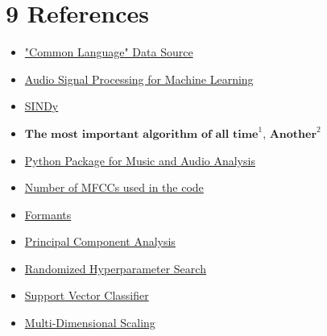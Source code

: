 \documentclass{article}
\begin{document}
\section*{9 \space References}
\begin{itemize}
    \item \href{https://huggingface.co/datasets/common_language}{"Common Language" Data Source}

    \item \href{https://www.youtube.com/playlist?list=PL-wATfeyAMNqIee7cH3q1bh4QJFAaeNv0}{Audio Signal Processing for Machine Learning}

    \item \href{https://www.youtube.com/playlist?list=PLkjmwL-pF6dzj5aSN2sa4ZNm92G9b4ca2}{SINDy}

    \item \href{https://youtu.be/nmgFG7PUHfo?si=emVgNvaE7BQpk3al}{$\textbf{The most important algorithm of all time}^1$}, \href{https://bootcamp.uxdesign.cc/the-most-important-algorithm-of-all-time-9ff1659ff3ef}{$\textbf{Another}^2$}
    
    \item \href{https://librosa.org/doc/latest/index.html}{Python Package for Music and Audio Analysis}

    \item \href{https://ietresearch.onlinelibrary.wiley.com/doi/full/10.1049/tje2.12082#:~:text=All\%20performance\%20metrics\%20gave\%20the,studies\%20use\%20only\%2013\%20MFCCs}{Number of MFCCs used in the code}

    \item \href{https://corpus.eduhk.hk/english_pronunciation/index.php/2-2-formants-of-vowels/}{Formants}
    
    \item \href{https://scikit-learn.org/stable/modules/generated/sklearn.decomposition.PCA.html}{Principal Component Analysis}
    
    \item \href{https://scikit-learn.org/stable/modules/generated/sklearn.model_selection.RandomizedSearchCV.html}{Randomized Hyperparameter Search}

    \item \href{https://scikit-learn.org/stable/modules/generated/sklearn.svm.SVC.html}{Support Vector Classifier}
    
    \item \href{https://scikit-learn.org/stable/modules/manifold.html#multi-dimensional-scaling-mds}{Multi-Dimensional Scaling}
    

\end{itemize}
\end{document}
